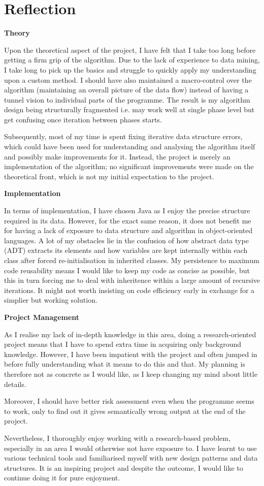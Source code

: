\chapter{Reflection}

\textbf{Theory}
	
Upon the theoretical aspect of the project, I have felt that I take too long before getting a firm grip of the algorithm. Due to the lack of experience to data mining, I take long to pick up the basics and struggle to quickly apply my understanding upon a custom method. I should have also maintained a macro-control over the algorithm (maintaining an overall picture of the data flow) instead of having a tunnel vision to individual parts of the programme. The result is my algorithm design being structurally fragmented i.e. may work well at single phase level but get confusing once iteration between phases starts.

Subsequently, most of my time is spent fixing iterative data structure errors, which could have been used for understanding and analysing the algorithm itself and possibly make improvements for it. Instead, the project is merely an implementation of the algorithm; no significant improvements were made on the theoretical front, which is not my initial expectation to the project. 

\bigskip
\textbf{Implementation}

In terms of implementation, I have chosen Java as I enjoy the precise structure required in its data. However, for the exact same reason, it does not benefit me for having a lack of exposure to data structure and algorithm in object-oriented languages. A lot of my obstacles lie in the confusion of how abstract data type (ADT) extracts its elements and how variables are kept internally within each class after forced re-initialisation in inherited classes. My persistence to maximum code reusability means I would like to keep my code as concise as possible, but this in turn forcing me to deal with inheritence within a large amount of recursive iterations. It might not worth insisting on code efficiency early in exchange for a simplier but working solution. 

\bigskip
\textbf{Project Management}

As I realise my lack of in-depth knowledge in this area, doing a research-oriented project means that I have to spend extra time in acquiring only background knowledge. However, I have been impatient with the project and often jumped in before fully understanding what it means to do this and that. My planning is therefore not as concrete as I would like, as I keep changing my mind about little details.

Moreover, I should have better risk assessment even when the programme seems to work, only to find out it gives semantically wrong output at the end of the project. 

\bigskip
Nevertheless, I thoroughly enjoy working with a research-based problem, especially in an area I would otherwise not have exposure to. I have learnt to use various technical tools and familiarised myself with new design patterns and data structures. It is an inspiring project and despite the outcome, I would like to continue doing it for pure enjoyment. 


